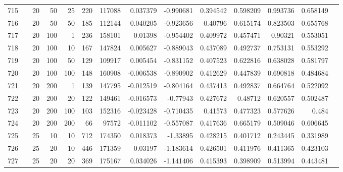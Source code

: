 \begin{longtable}{llrrrrrrrrrrrr}
		715 & &           20 &                50 &           25 &         220 &     117088 &  0.037379 & -0.990681 &  0.394542 &    0.598209 &       0.993736 &  0.658149 \\
		716 & &           20 &                50 &           50 &         185 &     112144 &  0.040205 & -0.923656 &   0.40796 &    0.615174 &       0.823503 &  0.655768 \\
		717 & &           20 &               100 &            1 &         236 &     158101 &   0.01398 & -0.954402 &  0.409972 &    0.457471 &        0.90321 &  0.553051 \\
		718 & &           20 &               100 &           10 &         167 &     147824 &  0.005627 & -0.889043 &  0.437089 &    0.492737 &       0.753131 &  0.553292 \\
		719 & &           20 &               100 &           50 &         129 &     109917 &  0.005454 & -0.831152 &  0.407523 &    0.622816 &       0.638028 &  0.581797 \\
		720 & &           20 &               100 &          100 &         148 &     160908 & -0.006538 & -0.890902 &  0.412629 &    0.447839 &       0.690818 &  0.484684 \\
		721 & &           20 &               200 &            1 &         139 &     147795 & -0.012519 & -0.804164 &  0.437413 &    0.492837 &       0.664764 &  0.522092 \\
		722 & &           20 &               200 &           20 &         122 &     149461 & -0.016573 &  -0.77943 &  0.427672 &     0.48712 &       0.620557 &  0.502487 \\
		723 & &           20 &               200 &          100 &         103 &     152316 & -0.023428 & -0.710435 &   0.41573 &    0.477323 &       0.577626 &     0.484 \\
		724 & &           20 &               200 &          200 &          66 &      97572 & -0.011102 & -0.557087 &  0.417636 &    0.665179 &       0.509046 &  0.606645 \\
		725 & &           25 &                10 &           10 &         712 &     174350 &  0.018373 &  -1.33895 &  0.428215 &    0.401712 &       0.243445 &  0.331989 \\
		726 & &           25 &                20 &           10 &         446 &     171359 &   0.03197 & -1.183614 &  0.426501 &    0.411976 &       0.411365 &  0.423103 \\
		727 & &           25 &                20 &           20 &         369 &     175167 &  0.034026 & -1.141406 &  0.415393 &    0.398909 &       0.513994 &  0.443481 \\

\end{longtable}
